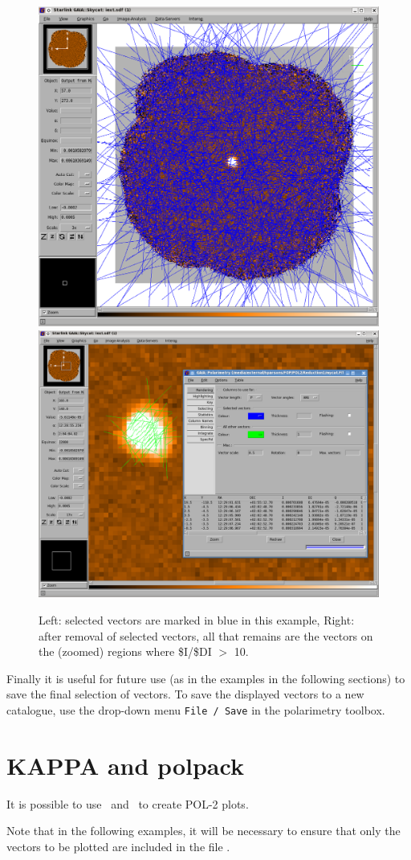 \begin{figure}[t!]
\begin{center}
\includegraphics[width=0.44\linewidth]{sc22-gaia-plot-vectors-5.png}
\includegraphics[width=0.52\linewidth]{sc22-gaia-plot-vectors-7.png}
\caption [Over Plotting Vectors in GAIA]{ Left: selected vectors are
  marked in blue in this example, Right: after removal of selected
  vectors, all that remains are the vectors on the (zoomed) regions
  where \$I/\$DI $>$ 10.}
\label{fig:gaiavectorsfinal}
\end{center}
\end{figure}


Finally it is useful for future use (as in the examples in the
following sections) to save the final selection of vectors. To save the
displayed vectors to a new catalogue, use the drop-down menu
\texttt{File / Save} in the polarimetry toolbox.

\section{KAPPA and polpack}

It is possible to use \Kappa\ and \polpack\ to create POL-2 plots.

\begin{terminalv}
\end{terminalv}

Note that in the following examples, it will be necessary to ensure
that only the vectors to be plotted are included in the file
.

